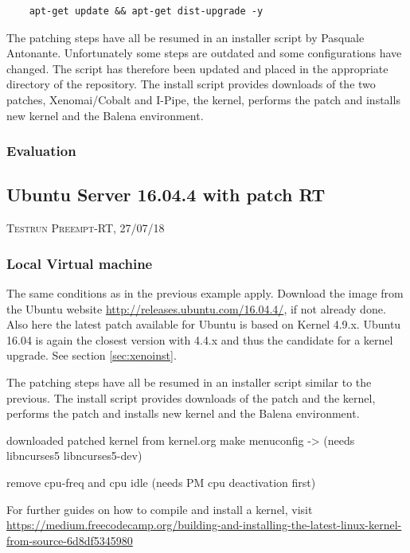 \documentclass[]{scrartcl}
\begin{document}
\begin{verbatim}
	apt-get update && apt-get dist-upgrade -y
\end{verbatim}

The patching steps have all be resumed in an installer script by Pasquale Antonante. Unfortunately some steps are outdated and some configurations have changed. The script has therefore been updated and placed in the appropriate directory of the repository. The install script provides downloads of the two patches, Xenomai/Cobalt and I-Pipe, the kernel, performs the patch and installs new kernel and the Balena environment.

\subsubsection{Evaluation}




\subsection{Ubuntu Server 16.04.4 with patch RT}

{\small\textsc{Testrun Preempt-RT, 27/07/18} \bigskip}


\subsubsection{Local Virtual machine}

The same conditions as in the previous example apply. Download the image from the Ubuntu website \url{http://releases.ubuntu.com/16.04.4/}, if not already done. Also here the latest patch available for Ubuntu is based on Kernel 4.9.x. Ubuntu 16.04 is again the closest version with 4.4.x and thus the candidate for a kernel upgrade. See section \ref{sec:xenoinst}.

The patching steps have all be resumed in an installer script similar to the previous. The install script provides downloads of the patch and the kernel, performs the patch and installs new kernel and the Balena environment.

downloaded patched kernel from kernel.org
make menuconfig
-> (needs libncurses5 libncurses5-dev)

remove cpu-freq and cpu idle (needs PM cpu deactivation first)

For further guides on how to compile and install a kernel, visit \url{ https://medium.freecodecamp.org/building-and-installing-the-latest-linux-kernel-from-source-6d8df5345980}
\end{document}
